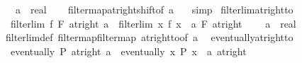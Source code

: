 \begin{isabellebody}
\ \ \ a\ {\isacharcolon}{\kern0pt}{\isacharcolon}{\kern0pt}\ real\isanewline
%
\isadelimproof
\ \ %
\endisadelimproof
%
\isatagproof
{}\isamarkupfalse%
\ filtermap{\isacharunderscore}{\kern0pt}at{\isacharunderscore}{\kern0pt}right{\isacharunderscore}{\kern0pt}shift{\isacharbrackleft}{\kern0pt}of\ {\isachardoublequoteopen}{\isacharminus}{\kern0pt}a{\isachardoublequoteclose}\ {}{\isacharbrackright}{\kern0pt}\ \isamarkupfalse%
\ simp%
\endisatagproof
{\isafoldproof}%
%
\isadelimproof
\isanewline
%
\endisadelimproof
\isanewline
{}\isamarkupfalse%
\ filterlim{\isacharunderscore}{\kern0pt}at{\isacharunderscore}{\kern0pt}right{\isacharunderscore}{\kern0pt}to{\isacharunderscore}{\kern0pt}{}{\isacharcolon}{\kern0pt}\isanewline
\ \ {\isachardoublequoteopen}filterlim\ f\ F\ {\isacharparenleft}{\kern0pt}at{\isacharunderscore}{\kern0pt}right\ a{\isacharparenright}{\kern0pt}\ {\isasymlongleftrightarrow}\ filterlim\ {\isacharparenleft}{\kern0pt}{\isasymlambda}x{\isachardot}{\kern0pt}\ f\ {\isacharparenleft}{\kern0pt}x\ {\isacharplus}{\kern0pt}\ a{\isacharparenright}{\kern0pt}{\isacharparenright}{\kern0pt}\ F\ {\isacharparenleft}{\kern0pt}at{\isacharunderscore}{\kern0pt}right\ {}{\isacharparenright}{\kern0pt}{\isachardoublequoteclose}\isanewline
\ \ \ a\ {\isacharcolon}{\kern0pt}{\isacharcolon}{\kern0pt}\ real\isanewline
%
\isadelimproof
\ \ %
\endisadelimproof
%
\isatagproof
{}\isamarkupfalse%
\ filterlim{\isacharunderscore}{\kern0pt}def\ filtermap{\isacharunderscore}{\kern0pt}filtermap\ at{\isacharunderscore}{\kern0pt}right{\isacharunderscore}{\kern0pt}to{\isacharunderscore}{\kern0pt}{}{\isacharbrackleft}{\kern0pt}of\ a{\isacharbrackright}{\kern0pt}\ \isacommand{{\isachardot}{\kern0pt}{\isachardot}{\kern0pt}}\isamarkupfalse%
%
\endisatagproof
{\isafoldproof}%
%
\isadelimproof
\isanewline
%
\endisadelimproof
\isanewline
{}\isamarkupfalse%
\ eventually{\isacharunderscore}{\kern0pt}at{\isacharunderscore}{\kern0pt}right{\isacharunderscore}{\kern0pt}to{\isacharunderscore}{\kern0pt}{}{\isacharcolon}{\kern0pt}\isanewline
\ \ {\isachardoublequoteopen}eventually\ P\ {\isacharparenleft}{\kern0pt}at{\isacharunderscore}{\kern0pt}right\ a{\isacharparenright}{\kern0pt}\ {\isasymlongleftrightarrow}\ eventually\ {\isacharparenleft}{\kern0pt}{\isasymlambda}x{\isachardot}{\kern0pt}\ P\ {\isacharparenleft}{\kern0pt}x\ {\isacharplus}{\kern0pt}\ a{\isacharparenright}{\kern0pt}{\isacharparenright}{\kern0pt}\ {\isacharparenleft}{\kern0pt}at{\isacharunderscore}{\kern0pt}right\ {}{\isacharparenright}{\kern0pt}{\isachardoublequoteclose}\isanewline

\end{isabellebody}
